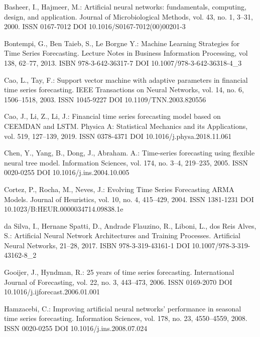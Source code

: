 
\begin{thebibliography}{99.}

 Basheer, I., Hajmeer, M.: Artificial neural networks: fundamentals, computing, design, and application. Journal of Microbiological Methods, vol. 43, no. 1, 3--31, 2000. ISSN 0167-7012 DOI 10.1016/S0167-7012(00)00201-3

 Bontempi, G., Ben Taieb, S., Le Borgne Y.: Machine Learning Strategies for Time Series Forecasting. Lecture Notes in Business Information Processing, vol 138, 62--77, 2013. ISBN 978-3-642-36317-7 DOI 10.1007/978-3-642-36318-4\_3

 Cao, L., Tay, F.: Support vector machine with adaptive parameters in financial time series forecasting. IEEE Transactions on Neural Networks, vol. 14, no. 6, 1506--1518, 2003. ISSN 1045-9227 DOI 10.1109/TNN.2003.820556

 Cao, J., Li, Z., Li, J.: Financial time series forecasting model based on CEEMDAN and LSTM. Physica A: Statistical Mechanics and its Applications, vol. 519, 127--139, 2019. ISSN 0378-4371 DOI 10.1016/j.physa.2018.11.061

 Chen, Y., Yang, B., Dong, J., Abraham. A.: Time-series forecasting using flexible neural tree model. Information Sciences, vol. 174, no. 3--4, 219--235, 2005. ISSN 0020-0255 DOI 10.1016/j.ins.2004.10.005

 Cortez, P., Rocha, M., Neves, J.: Evolving Time Series Forecasting ARMA Models. Journal of Heuristics, vol. 10, no. 4, 415--429, 2004. ISSN 1381-1231 DOI 10.1023/B:HEUR.0000034714.09838.1e

 da Silva, I., Hernane Spatti, D., Andrade Flauzino, R., Liboni, L., dos Reis Alves, S.: Artificial Neural Network Architectures and Training Processes. Artificial Neural Networks, 21--28, 2017. ISBN 978-3-319-43161-1 DOI 10.1007/978-3-319-43162-8\_2

 Gooijer, J., Hyndman, R.: 25 years of time series forecasting. International Journal of Forecasting, vol. 22, no. 3, 443--473, 2006. ISSN 0169-2070 DOI 10.1016/j.ijforecast.2006.01.001

 Hamzacebi, C.: Improving artificial neural networks’ performance in seasonal time series forecasting. Information Sciences, vol. 178, no. 23, 4550--4559, 2008. ISSN 0020-0255 DOI 10.1016/j.ins.2008.07.024


\end{thebibliography}
